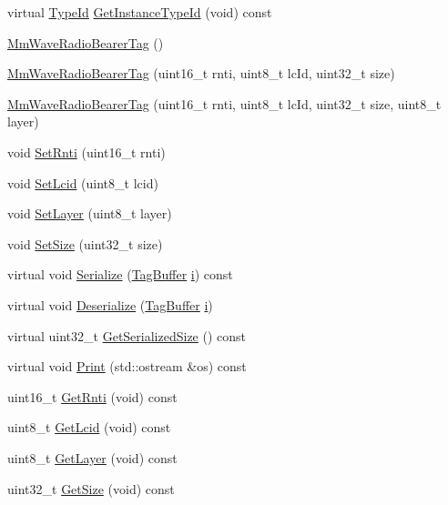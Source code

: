 \begin{DoxyCompactItemize}
\item 
virtual \hyperlink{classns3_1_1TypeId}{Type\+Id} \hyperlink{classns3_1_1MmWaveRadioBearerTag_ab246a30a3480933b43996fa268d4eeb3}{Get\+Instance\+Type\+Id} (void) const 
\item 
\hyperlink{classns3_1_1MmWaveRadioBearerTag_aa673fe5465435130910e330a0cd5c9c7}{Mm\+Wave\+Radio\+Bearer\+Tag} ()
\item 
\hyperlink{classns3_1_1MmWaveRadioBearerTag_a4d48e5bcaa4260583143382dcf4c3e06}{Mm\+Wave\+Radio\+Bearer\+Tag} (uint16\+\_\+t rnti, uint8\+\_\+t lc\+Id, uint32\+\_\+t size)
\item 
\hyperlink{classns3_1_1MmWaveRadioBearerTag_a4a566faff286949ec09e7d27f6b76b92}{Mm\+Wave\+Radio\+Bearer\+Tag} (uint16\+\_\+t rnti, uint8\+\_\+t lc\+Id, uint32\+\_\+t size, uint8\+\_\+t layer)
\item 
void \hyperlink{classns3_1_1MmWaveRadioBearerTag_a8e2efecf158a052dc0aa1201f3d7e01e}{Set\+Rnti} (uint16\+\_\+t rnti)
\item 
void \hyperlink{classns3_1_1MmWaveRadioBearerTag_ae9097368a19866aca224a3fb1f1ef9cd}{Set\+Lcid} (uint8\+\_\+t lcid)
\item 
void \hyperlink{classns3_1_1MmWaveRadioBearerTag_aec94eccc6dd19dcdec30ecf0901d8fc0}{Set\+Layer} (uint8\+\_\+t layer)
\item 
void \hyperlink{classns3_1_1MmWaveRadioBearerTag_aaf35bf074f6f31f1e43b67efac43ec88}{Set\+Size} (uint32\+\_\+t size)
\item 
virtual void \hyperlink{classns3_1_1MmWaveRadioBearerTag_a00ee7737ce231f964d1f49c9292e2baf}{Serialize} (\hyperlink{classns3_1_1TagBuffer}{Tag\+Buffer} \hyperlink{lte__uplink__power__control_8m_a6f6ccfcf58b31cb6412107d9d5281426}{i}) const 
\item 
virtual void \hyperlink{classns3_1_1MmWaveRadioBearerTag_a793304c327b0396635bebe55ee1aa225}{Deserialize} (\hyperlink{classns3_1_1TagBuffer}{Tag\+Buffer} \hyperlink{lte__uplink__power__control_8m_a6f6ccfcf58b31cb6412107d9d5281426}{i})
\item 
virtual uint32\+\_\+t \hyperlink{classns3_1_1MmWaveRadioBearerTag_a7346e70b72c418a34297405aab6a0c77}{Get\+Serialized\+Size} () const 
\item 
virtual void \hyperlink{classns3_1_1MmWaveRadioBearerTag_ae453046888df0245ec60a4ecb608d511}{Print} (std\+::ostream \&os) const 
\item 
uint16\+\_\+t \hyperlink{classns3_1_1MmWaveRadioBearerTag_ac017b43da0ef932266300571eba7aff8}{Get\+Rnti} (void) const 
\item 
uint8\+\_\+t \hyperlink{classns3_1_1MmWaveRadioBearerTag_acf140e5d830d8ce3b1c39931b6b37666}{Get\+Lcid} (void) const 
\item 
uint8\+\_\+t \hyperlink{classns3_1_1MmWaveRadioBearerTag_aabc4c223b5d8f6a6ccc21cb609051fca}{Get\+Layer} (void) const 
\item 
uint32\+\_\+t \hyperlink{classns3_1_1MmWaveRadioBearerTag_aea866175941ddc84a6a240c074e6814f}{Get\+Size} (void) const 
\end{DoxyCompactItemize}
